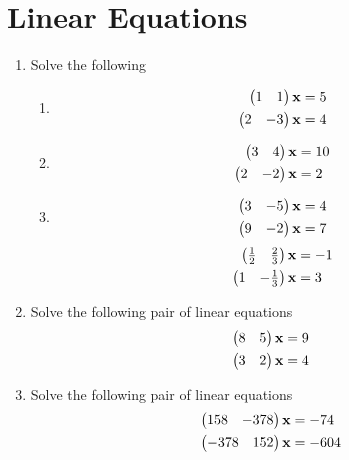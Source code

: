 \documentclass[journal,12pt,twocolumn]{IEEEtran}
\renewcommand\thesection{\arabic{section}}
\begin{document}
\section{Linear Equations}
\renewcommand{\theequation}{\theenumi}
\begin{enumerate}[label=\thesection.\arabic*.,ref=\thesection.\theenumi]
\item Solve the following
%
\begin{enumerate}[itemsep=2pt]
\item
\begin{align}
\begin{split}
\begin{pmatrix}1 & 1 \end{pmatrix}\mathbf{x}&=5
\\
\begin{pmatrix}2 & -3 \end{pmatrix}\mathbf{x}&=4
\end{split}
\end{align}
\item
\begin{align}
\begin{split}
\begin{pmatrix}3 & 4 \end{pmatrix}\mathbf{x}&=10
\\
\begin{pmatrix}2 & -2 \end{pmatrix}\mathbf{x}&=2
\end{split}
\end{align}
\item
\begin{align}
\begin{split}
\begin{pmatrix}3 & -5 \end{pmatrix}\mathbf{x}&=4
\\
\begin{pmatrix}9 & -2 \end{pmatrix}\mathbf{x}&=7
\end{split}
\end{align}
\begin{align}
\begin{split}
\begin{pmatrix}\frac{1}{2} & \frac{2}{3} \end{pmatrix}\mathbf{x}&=-1
\\
\begin{pmatrix}{1} & -\frac{1}{3} \end{pmatrix}\mathbf{x}&=3
\end{split}
\end{align}
\end{enumerate}
%
\solution 
%

\item Solve the following pair of linear equations
\begin{align}
\begin{split}
\begin{pmatrix}8 & 5 \end{pmatrix}\mathbf{x}&=9
\\
\begin{pmatrix}3 & 2 \end{pmatrix}\mathbf{x}&=4
\end{split}
\end{align}
\solution 
%
%
\item Solve the following pair of linear equations
\begin{align}
\begin{split}
\begin{pmatrix}158 & -378 \end{pmatrix}\mathbf{x}&=-74
\\
\begin{pmatrix}-378 & 152 \end{pmatrix}\mathbf{x}&=-604
\end{split}
\end{align}
\solution 
%


\end{enumerate}
\end{document}

